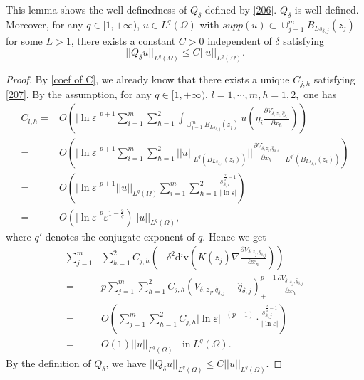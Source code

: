 \documentclass[12pt,reqno]{amsart}
\numberwithin{equation}{section}
\theoremstyle{definition}
\newenvironment{customthm}[1]
{\renewcommand\theinnercustomthm{#1}\innercustomthm}
{\endinnercustomthm}
\theoremstyle{remark}
\begin{document}
This lemma shows the well-definedness of $ Q_\delta $ defined by \eqref{206}.
\begin{customthm}{A.3}\label{lemA-4}
$ Q_\delta $ is well-defined. Moreover, for any $ q\in[1,+\infty) $, $ u\in L^q(\Omega) $ with $ supp(u)\subset  \cup_{j=1}^mB_{Ls_{\delta,j}}(z_j)$ for some $ L>1 $, there exists a constant $ C>0 $ independent of $ \delta $ satisfying
\begin{equation*}
||Q_\delta u||_{L^q(\Omega)}\leq C||u||_{L^q(\Omega)}.
\end{equation*}
	
\end{customthm}
\begin{proof}
By \eqref{coef of C}, we already know that there exists a unique $ C_{j,h} $ satisfying \eqref{207}. By the assumption, for any $ q\in[1,+\infty) $, $ l=1,\cdots,m, h=1,2, $ one has
\begin{equation*}
\begin{split}
C_{l,h}=&O\left( |\ln\varepsilon|^{p+1}\sum_{i=1}^m\sum_{\hbar=1}^2\int_{\cup_{j=1}^mB_{Ls_{\delta,j}}(z_j)}u  \left( \eta_i\frac{\partial V_{\delta, z_i, \hat{q}_{\delta,i}}}{\partial x_\hbar}\right)   \right) \\
=&O\left( |\ln\varepsilon|^{p+1}\sum_{i=1}^m\sum_{\hbar=1}^2||u||_{L^q(B_{Ls_{\delta,i}}(z_i))}||\frac{\partial V_{\delta, z_i, \hat{q}_{\delta,i}}}{\partial x_\hbar}||_{L^{q'}(B_{Ls_{\delta,i}}(z_i))}\right) \\
=&O\left( |\ln\varepsilon|^{p+1}||u||_{L^q(\Omega)}\sum_{i=1}^m\sum_{\hbar=1}^2\frac{s_{\delta,i}^{\frac{2}{q'}-1}}{|\ln\varepsilon|}\right) \\
=&O\left (|\ln\varepsilon|^{p}\varepsilon^{1-\frac{2}{q}}\right )||u||_{L^q(\Omega)},
\end{split}
\end{equation*}
where $ q' $ denotes the conjugate exponent of $ q $. Hence we get
\begin{equation*}
\begin{split}
\sum_{j=1}^m&\sum_{h=1}^2C_{j,h}\left( -\delta^2\text{div}\left (K(z_j)\nabla   \frac{\partial V_{\delta, z_j, \hat{q}_{\delta,j}}}{\partial x_h}\right )\right)\\
=&p\sum_{j=1}^m\sum_{h=1}^2C_{j,h}(V_{\delta, z_{j}, \hat{q}_{\delta,j}}-\hat{q}_{\delta,j})^{p-1}_+ \frac{\partial V_{\delta, z_{j}, \hat{q}_{\delta,j}}}{\partial x_h} \\
=&O\left( \sum_{j=1}^m\sum_{h=1}^2C_{j,h}|\ln\varepsilon|^{-(p-1)}\cdot \frac{s_{\delta,j}^{\frac{2}{q}-1}}{|\ln\varepsilon|}\right) \\
=&O(1)||u||_{L^q(\Omega)}\ \ \ \ \text{in}\ L^q(\Omega).
\end{split}
\end{equation*}
By the definition of $ Q_\delta $, we have $ ||Q_\delta u||_{L^q(\Omega)}\leq C||u||_{L^q(\Omega)} $.

\end{proof}
\end{document}
